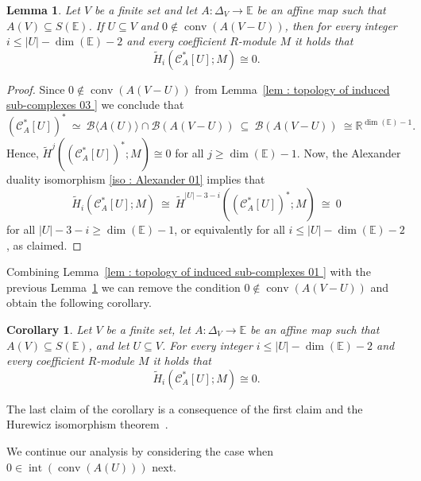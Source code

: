 \documentclass[a4paper,11pt,reqno, english]{amsart}
\newtheorem{lemma}[theorem]{Lemma}
\newtheorem{corollary}[theorem]{Corollary}
\theoremstyle{definition}
\theoremstyle{remark}
\newcommand\R{\mathbb R}
\newcommand\CC{\mathscr C}
\newcommand\E{\mathbb{E}}
\DeclareMathOperator{\interior}{\mathrm{int}}
\DeclareMathOperator{\conv}{\mathrm{conv}}
\begin{document}
\medskip
\begin{lemma}
	\label{lem : topology of induced sub-complexes 03.5 }
	Let $V$ be a finite set and let $A\colon \Delta_V\longrightarrow\E$ be an affine map such that $A(V)\subseteq S(\E)$.
	If $U\subseteq V$ and $0\notin\conv(A(V-U))$, then for every integer $i\leq |U|-\dim(\E)-2$ and every coefficient $R$-module $M$ it holds that
	\[
		\widetilde{H}_i(\CC_A^*[U];M)\cong 0.
	\]
\end{lemma}
\begin{proof}
	Since $0\notin\conv(A(V-U))$ from Lemma~\ref{lem : topology of induced sub-complexes 03 } we conclude that
	\[
		(\CC_A^*[U])^* \ \simeq \ \mathscr{B}\langle A(U)\rangle\cap \mathscr{B}(A(V-U))\ \subseteq \  \mathscr{B}(A(V-U)) \ \cong \R^{\dim(\E)-1}.
	\]
	Hence, $\widetilde{H}^j((\CC_A^*[U])^*;M)\cong 0$ for all $j\geq \dim(\E)-1$.
	Now, the Alexander duality isomorphism \eqref{iso : Alexander 01} implies that
	\[
		\widetilde{H}_i(\CC_A^*[U];M)\ \cong  \ \widetilde{H}^{|U|-3-i}((\CC_A^*[U])^* ;M)
		\ \cong  \ 0
	\]
	for all $|U|-3-i\geq \dim(\E)-1$, or equivalently for all $i\leq |U|-\dim(\E)-2$, as claimed.
\end{proof}

\medskip
Combining Lemma~\ref{lem : topology of induced sub-complexes 01 } with the previous Lemma~\ref{lem : topology of induced sub-complexes 03.5 } we can remove the condition $0\notin\conv(A(V-U))$ and obtain the following corollary.


\medskip
\begin{corollary}\label{cor : topology of induced sub-complexes 03.5 }
	Let $V$ be a finite set, let $A\colon \Delta_V\longrightarrow\E$ be an affine map such that $A(V)\subseteq S(\E)$, and let $U\subseteq V$.
	For every integer $i\leq |U|-\dim(\E)-2$ and every coefficient $R$-module $M$ it holds that
	\[
		\widetilde{H}_i(\CC_A^*[U];M)\cong 0.
	\]
\end{corollary}

\medskip
The last claim of the corollary is a consequence of the first claim and the Hurewicz isomorphism theorem~\cite[Thm.\,VII.10.7]{Bredon2010}.

\medskip
We continue our analysis by considering the case when $0\in\interior(\conv (A(U)))$ next.
\end{document}
